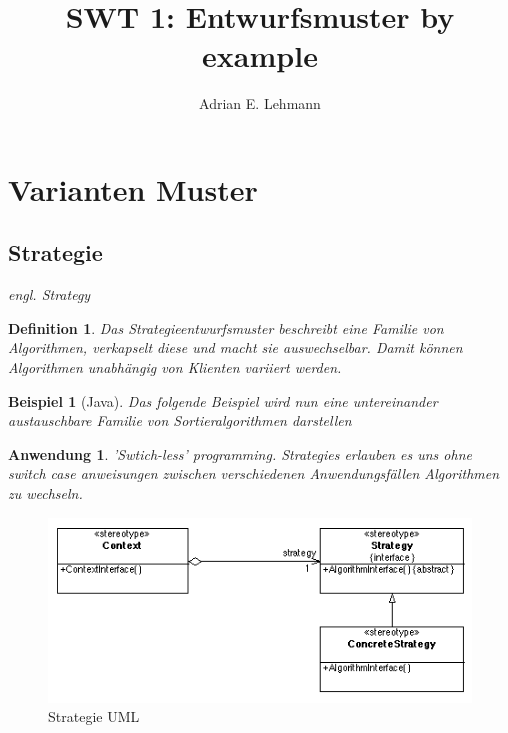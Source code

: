 \documentclass[a4paper]{article}
\title{SWT 1: Entwurfsmuster by example}
\author{Adrian E. Lehmann}
\theoremstyle{break}
\newtheorem{defi}{Definition}[section]
\newtheorem{ex}{Beispiel}[section]
\newtheorem{why}{Anwendung}[section]
\begin{document}
\maketitle
\tableofcontents
\newpage

\section{Varianten Muster}

\subsection{Strategie}

\textit{engl. Strategy}

\begin{defi}
	Das Strategieentwurfsmuster beschreibt eine Familie von Algorithmen, verkapselt diese und macht sie auswechselbar. Damit können Algorithmen unabhängig von Klienten variiert werden.
\end{defi}

\begin{ex}[Java]
	Das folgende Beispiel wird nun eine untereinander austauschbare Familie von Sortieralgorithmen darstellen


	
	
	
	
		
\end{ex}

\begin{why}
	'Swtich-less' programming. Strategies erlauben es uns ohne switch case anweisungen zwischen verschiedenen Anwendungsfällen Algorithmen zu wechseln.
\end{why}
\begin{figure}[H]
	\centering
	\includegraphics[width=\textwidth]{../diagrams/uml/StrategyPattern.png}
	\caption{Strategie UML}
\end{figure}
\end{document}
